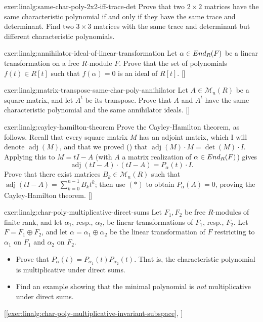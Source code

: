 \begin{exer}{}{exer:linalg:same-char-poly-2x2-iff-trace-det}
  Prove that two $2 \times 2$ matrices have the same characteristic
  polynomial if and only if they have the same trace and determinant.
  Find two $3 \times 3$ matrices with the same trace and determinant
  but different characteristic polynomials.
\end{exer}
\begin{exer}{\exerused}{exer:linalg:annihilator-ideal-of-linear-transformation}
  Let $\alpha \in End_R(F)$ be a linear transformation on a free
  $R$-module $F$. Prove that the set of polynomials $f(t) \in R[t]$
  such that $f(\alpha) = 0$ is an ideal of $R[t]$.
  []
\end{exer}
\begin{exer}{\exerused}{exer:linalg:matrix-transpose-same-char-poly-annihilator}
  Let $A \in \mathcal{M}_n(R)$ be a square matrix, and let $A^t$ be
  its transpose. Prove that $A$ and $A^t$ have the same characteristic
  polynomial and the same annihilator
  ideals. []
\end{exer}
\begin{exer}{\exerused}{exer:linalg:cayley-hamilton-theorem}
  Prove the Cayley-Hamilton theorem, as follows. Recall that every
  square matrix $M$ has an adjoint matrix, which I will denote
  $\operatorname{adj}(M)$, and that we proved () that
  $\operatorname{adj}(M) \cdot M = \det(M) \cdot I$. Applying this to
  $M = tI - A$ (with $A$ a matrix realization of
  $\alpha \in End_R(F)$) gives
  \[
    \tag{*} \operatorname{adj}(tI - A) \cdot (tI - A) = P_\alpha(t)
    \cdot I.
  \]
  Prove that there exist matrices $B_k \in \mathcal{M}_n(R)$ such that
  $\operatorname{adj}(tI - A) = \sum_{k=0}^{n-1} B_k t^k$; then use
  $(*)$ to obtain $P_\alpha(A) = 0$, proving the Cayley-Hamilton
  theorem.
  []
\end{exer}
\begin{exer}{\exerused}{exer:linalg:char-poly-multiplicative-direct-sums}
  Let $F_1, F_2$ be free $R$-modules of finite rank, and let
  $\alpha_1$, resp., $\alpha_2$, be linear transformations of $F_1$,
  resp., $F_2$. Let $F = F_1 \oplus F_2$, and let
  $\alpha = \alpha_1 \oplus \alpha_2$ be the linear transformation of
  $F$ restricting to $\alpha_1$ on $F_1$ and $\alpha_2$ on $F_2$.
  \begin{itemize}
  \item Prove that $P_\alpha(t) =
    P_{\alpha_1}(t)P_{\alpha_2}(t)$. That is, the characteristic
    polynomial is multiplicative under direct sums.
  \item Find an example showing that the minimal polynomial is
    \emph{not} multiplicative under direct sums.
  \end{itemize}
  [\ref{exer:linalg:char-poly-multiplicative-invariant-subspace}, ]
\end{exer}

